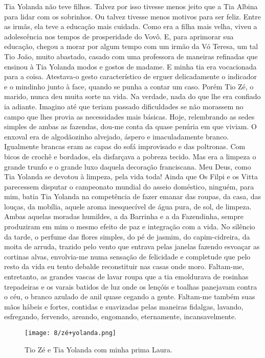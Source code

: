 Tia Yolanda não teve filhos.
Talvez por isso tivesse menos jeito que a Tia Albina para lidar com os sobrinhos.
Ou talvez tivesse menos motivos para ser feliz.
Entre as irmãs, ela teve a educação mais cuidada.
Como era a filha mais velha, viveu a adolescência nos tempos de prosperidade do Vovô.
E, para aprimorar sua educação, chegou a morar por algum tempo com um irmão da Vó Teresa, um tal Tio João, muito abastado, casado com uma professora de maneiras refinadas que ensinou à Tia Yolanda modos e gostos de madame.
E minha tia era vocacionada para a coisa.
Atestava-o gesto característico de erguer delicadamente o indicador e o mindinho junto à face, quando se punha a contar um caso.
Porém Tio Zé, o marido, nunca deu muita sorte na vida.
Na verdade, nada do que lhe era confiado ia adiante.
Imagino até que teriam passado dificuldades se não morassem no campo que lhes provia as necessidades mais básicas.
Hoje, relembrando as sedes simples de ambas as fazendas, dou-me conta da quase penúria em que viviam.
O enxoval era de algodãozinho alvejado, áspero e imaculadamente branco.
Igualmente brancas eram as capas do sofá improvisado e das poltronas.
Com bicos de crochê e bordados, ela disfarçava a pobreza tecido.
Mas era a limpeza o grande trunfo e o grande luxo daquela decoração franciscana.
Meu Deus, como Tia Yolanda se devotou à limpeza, pela vida toda! Ainda que Os Filpi e os Vitta parecessem disputar o campeonato mundial do asseio doméstico, ninguém, para mim, batia Tia Yolanda na competência de fazer emanar das roupas, da casa, das louças, da mobília, aquele aroma inesquecível de água pura, de sol, de limpeza.
Ambas aquelas moradas humildes, a da Barrinha e a da Fazendinha, sempre produziram em mim o mesmo efeito de paz e integração com a vida.
No silêncio da tarde, o perfume das flores simples, do pé de jasmim, do capim-cidreira, da moita de arruda, trazido pelo vento que entrava pelas janelas fazendo esvoaçar as cortinas alvas, envolvia-me numa sensação de felicidade e completude que pelo resto da vida eu tento debalde reconstituir nas casas onde moro.
Faltam-me, entretanto, as grandes vascas de lavar roupa que a tia emoldurava de rosinhas trepadeiras e os varais batidos de luz onde os lençóis e toalhas panejavam contra o céu, o branco azulado de anil quase cegando a gente.
Faltam-me também suas mãos hábeis e fortes, contidas e suavizadas pelas maneiras fidalgas, lavando, esfregando, fervendo, areando, engomando, eternamente, incansavelmente.

\begin{figure}[H]
\centering
\texttt{[image: 8/zé+yolanda.png]}
\caption{Tio Zé e Tia Yolanda com minha prima Laura.}
\end{figure}

